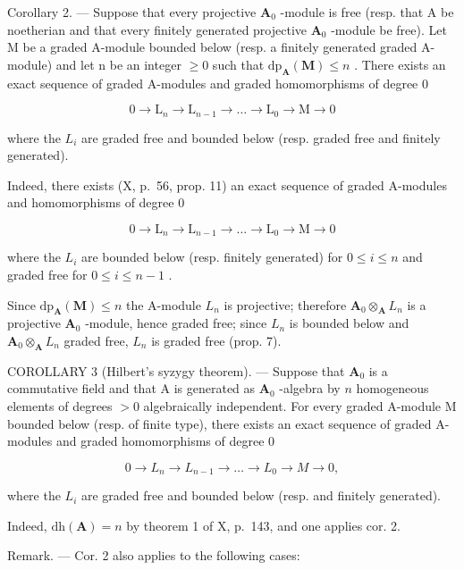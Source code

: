 Corollary 2. --- Suppose that every projective \(\mathbf{A}_{0}\) -module is free (resp. that A be noetherian and that every finitely generated projective \(\mathbf{A}_{0}\) -module be free). Let M be a graded A-module bounded below (resp. a finitely generated graded A-module) and let n be an integer \(\geqslant 0\) such that \(\mathrm{dp}_{\mathbf{A}}(\mathbf{M}) \leqslant n\) . There exists an exact sequence of graded A-modules and graded homomorphisms of degree 0

\[
0 \rightarrow \mathrm{L} _ {n} \rightarrow \mathrm{L} _ {n - 1} \rightarrow \dots \rightarrow \mathrm{L} _ {0} \rightarrow \mathrm{M} \rightarrow 0
\]

where the \(L_{i}\) are graded free and bounded below (resp. graded free and finitely generated).

Indeed, there exists (X, p.~56, prop. 11) an exact sequence of graded A-modules and homomorphisms of degree 0

\[
0 \to \mathrm{L} _ {n} \to \mathrm{L} _ {n - 1} \to \dots \to \mathrm{L} _ {0} \to \mathrm{M} \to 0
\]

where the \(L_{i}\) are bounded below (resp. finitely generated) for \(0 \leqslant i \leqslant n\) and graded free for \(0 \leqslant i \leqslant n - 1\) .

Since \(\mathrm{dp}_{\mathbf{A}}(\mathbf{M}) \leqslant n\) the A-module \(L_{n}\) is projective; therefore \(\mathbf{A}_0 \otimes_{\mathbf{A}} L_n\) is a projective \(\mathbf{A}_0\) -module, hence graded free; since \(L_{n}\) is bounded below and \(\mathbf{A}_0 \otimes_{\mathbf{A}} L_n\) graded free, \(L_{n}\) is graded free (prop. 7).

COROLLARY 3 (Hilbert's syzygy theorem). --- Suppose that \(\mathbf{A}_0\) is a commutative field and that A is generated as \(\mathbf{A}_0\) -algebra by \(n\) homogeneous elements of degrees \(>0\) algebraically independent. For every graded A-module M bounded below (resp. of finite type), there exists an exact sequence of graded A-modules and graded homomorphisms of degree 0

\[
0 \rightarrow L _ {n} \rightarrow L _ {n - 1} \rightarrow \dots \rightarrow L _ {0} \rightarrow M \rightarrow 0,
\]

where the \(L_{i}\) are graded free and bounded below (resp. and finitely generated).

Indeed, \(\mathrm{dh}(\mathbf{A}) = n\) by theorem 1 of X, p.~143, and one applies cor. 2.

Remark. --- Cor. 2 also applies to the following cases:

